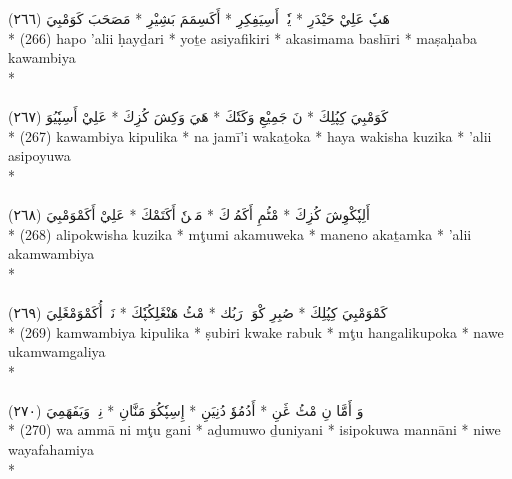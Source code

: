 \documentclass[a4paper, 12pt]{report}
\begin{document}
\begin{center}
\textarabic{(٢٦٦) \textcolor{mygreen}{هَپٗ عَلِيْ حَيْدَرِ  * يٗتٖ أَسِيَفِكِرِ  * أَكَسِمَمَ بَشِيْرِ  * مَصَحَبَ كَوَمْبِيَ }} \\* 
(266) hapo 'alii ḥayḏari  * yoṯe asiyafikiri  * akasimama bashı̄ri  * maṣaḥaba kawambiya  \\* 
 \\ 
\\[8mm] 

\textarabic{(٢٦٧) \textcolor{mygreen}{كَوَمْبِيَ كِپُلِكَ  * نَ جَمِيْعِ وَكَتٗكَ  * هَيَ وَكِشَ كُزِكَ  * عَلِيْ أَسِپٗيُوَ }} \\* 
(267) kawambiya kipulika  * na jamī'i wakaṯoka  * haya wakisha kuzika  * 'alii asipoyuwa  \\* 
 \\ 
\\[8mm] 

\textarabic{(٢٦٨) \textcolor{mygreen}{أَلِپٗكْوِشَ كُزِكَ  * مْٹُمِ أَكَمُوٖكَ  * مَنٖنٗ أَكَتَمْكَ  * عَلِيْ أَكَمْوَمْبِيَ }} \\* 
(268) alipokwisha kuzika  * mţumi akamuweka  * maneno akaṯamka  * 'alii akamwambiya  \\* 
 \\ 
\\[8mm] 

\textarabic{(٢٦٩) \textcolor{mygreen}{كَمْوَمْبِيَ كِپُلِكَ  * صُبِرِ كْوَكٖ رَبُك  * مْٹُ هَنْڠَلِكُپٗكَ  * نَوٖ أُكَمْوَمْڠَلِيَ }} \\* 
(269) kamwambiya kipulika  * ṣubiri kwake rabuk  * mţu hangalikupoka  * nawe ukamwamgaliya  \\* 
 \\ 
\\[8mm] 

\textarabic{(٢٧٠) \textcolor{mygreen}{وَ أَمَّا نِ مْٹُ ڠَنِ  * أَدُمُوٗ دُنِيَنِ  * إِسِپٗكُوَ مَنَّانِ  * نِوٖ وَيَفَهَمِيَ }} \\* 
(270) wa ammā ni mţu gani  * aḏumuwo ḏuniyani  * isipokuwa mannāni  * niwe wayafahamiya  \\* 
 \\ 
\\[8mm] 


\end{center}
\end{document}
